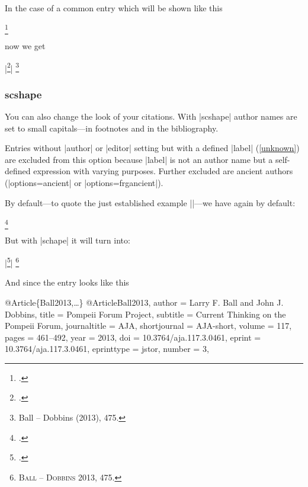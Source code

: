 \documentclass[a4paper,
10pt,
greek,
french,
spanish,
italian,
ngerman,
english
]{ltxdoc}
\begin{document}
In the case of a common entry which will be shown like this
\begin{example}
\footnote{\cite[475]{Ball2013}.}
\end{example}


now we get

\begin{tcolorbox}[examplebox] 
|\footnote{\cite[475]{Ball2013}.}|
\tcblower
\footnote{Ball – Dobbins {\color{red}(}2013{\color{red})}, 475.}
\end{tcolorbox}


\subsubsection{scshape}\label{scshape}
You can also change the look of your citations. 
With |scshape| author names are set to small capitals---in footnotes and in the bibliography.

Entries without |author| or |editor| setting but with a defined
 |label| (\cref{unknown}) are excluded from this option
because |label| is not an author name but a self-defined expression with varying purposes.
Further excluded are ancient authors (|options={ancient}| or |options={frgancient}|).

By default---to quote the just established example ||---we have again by default:

\begin{example}
\footnote{\cite[475]{Ball2013}.}
\end{example}

But with |schape| it will turn into:

\begin{tcolorbox}[examplebox] 
|\footnote{\cite[475]{Ball2013}.}|
\tcblower
\footnote{{\scshape {\color{red}Ball – Dobbins}} 2013, 475.}
\end{tcolorbox}

And since the entry looks like this

\begin{bibexample}[label=Ball2013]{{@}Article\{Ball2013,…\}}
@Article{Ball2013,
author       = {Larry F. Ball and John J. Dobbins},
title        = {Pompeii Forum Project},
subtitle     = {Current Thinking on the Pompeii Forum},
journaltitle = AJA,
shortjournal = AJA-short,
volume       = {117},
pages        = {461--492},
year         = {2013},
doi          = {10.3764/aja.117.3.0461},
eprint       = {10.3764/aja.117.3.0461},
eprinttype   = {jstor},
number       = {3},
}
\end{bibexample}
\end{document}
